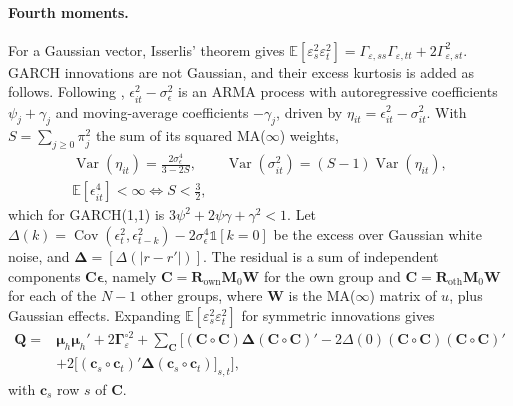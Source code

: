 \documentclass[12pt]{article}
\begin{document}
\paragraph{Fourth moments.} For a Gaussian vector, Isserlis' theorem gives $\mathbb E[\varepsilon_s^2\varepsilon_t^2]=\Gamma_{\varepsilon,ss}\Gamma_{\varepsilon,tt}+2\Gamma_{\varepsilon,st}^2$. GARCH innovations are not Gaussian, and their excess kurtosis is added as follows. Following \citet{bollerslev1986generalized}, $\epsilon_{it}^2-\sigma_\epsilon^2$ is an ARMA process with autoregressive coefficients $\psi_j+\gamma_j$ and moving-average coefficients $-\gamma_j$, driven by $\eta_{it}=\epsilon_{it}^2-\sigma_{it}^2$. With $S=\sum_{j\ge0}\pi_j^2$ the sum of its squared MA($\infty$) weights,
\begin{equation}
\begin{gathered}
\operatorname{Var}(\eta_{it})=\frac{2\sigma_\epsilon^4}{3-2S},\qquad
\operatorname{Var}(\sigma_{it}^2)=(S-1)\operatorname{Var}(\eta_{it}),\\
\mathbb{E}[\epsilon_{it}^4]<\infty\iff S<\tfrac32,
\end{gathered}
\label{eq:fourth-moment-condition}
\end{equation}
which for GARCH(1,1) is $3\psi^2+2\psi\gamma+\gamma^2<1$. Let $\Delta(k)=\operatorname{Cov}(\epsilon_t^2,\epsilon_{t-k}^2)-2\sigma_\epsilon^4\mathbb 1[k=0]$ be the excess over Gaussian white noise, and $\boldsymbol\Delta=[\Delta(|r-r'|)]$. The residual is a sum of independent components $\mathbf C\boldsymbol\epsilon$, namely $\mathbf C=\mathbf R_{\mathrm{own}}\mathbf M_0\mathbf W$ for the own group and $\mathbf C=\mathbf R_{\mathrm{oth}}\mathbf M_0\mathbf W$ for each of the $N-1$ other groups, where $\mathbf W$ is the MA($\infty$) matrix of $u$, plus Gaussian effects. Expanding $\mathbb E[\varepsilon_s^2\varepsilon_t^2]$ for symmetric innovations gives
\begin{equation}
\begin{aligned}
\mathbf Q={}&\boldsymbol\mu_h\boldsymbol\mu_h'+2\boldsymbol\Gamma_\varepsilon^{\circ2}
+\sum_{\mathbf C}\Big[(\mathbf C\circ\mathbf C)\boldsymbol\Delta(\mathbf C\circ\mathbf C)'-2\Delta(0)(\mathbf C\circ\mathbf C)(\mathbf C\circ\mathbf C)'\\
&+2\big[(\mathbf c_s\circ\mathbf c_t)'\boldsymbol\Delta(\mathbf c_s\circ\mathbf c_t)\big]_{s,t}\Big],
\end{aligned}
\label{eq:fourth-moment-excess}
\end{equation}
with $\mathbf c_s$ row $s$ of $\mathbf C$.
\end{document}
